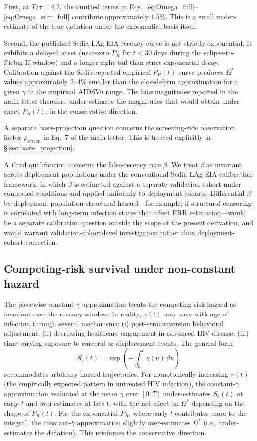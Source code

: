 \documentclass[11pt]{article}
\begin{document}
First, at $T/\tau = 4.2$, the omitted terms in Eqs.~\ref{eq:Omega_full}--\ref{eq:Omega_star_full} contribute approximately $1.5\%$. This is a small under-estimate of the true deflation under the exponential basis itself.

Second, the published Sedia LAg-EIA recency curve is not strictly exponential. It exhibits a delayed onset (near-zero $P_R$ for $t < 30$ days during the eclipse-to-Fiebig-II window) and a longer right tail than strict exponential decay. Calibration against the Sedia-reported empirical $P_R(t)$ curve produces $\Omega^*$ values approximately 2--4\% smaller than the closed-form approximation for a given $\gamma$ in the empirical AIDSVu range. The bias magnitudes reported in the main letter therefore under-estimate the magnitudes that would obtain under exact $P_R(t)$, in the conservative direction.

A separate basis-projection question concerns the screening-side observation factor $\rho_{\mathrm{screen}}$ in Eq.~7 of the main letter. This is treated explicitly in §\ref{sec:basis_projection}.

A third qualification concerns the false-recency rate $\beta$. We treat $\beta$ as invariant across deployment populations under the conventional Sedia LAg-EIA calibration framework, in which $\beta$ is estimated against a separate validation cohort under controlled conditions and applied uniformly to deployment cohorts. Differential $\beta$ by deployment-population structural hazard---for example, if structural censoring is correlated with long-term infection states that affect FRR estimation---would be a separate calibration question outside the scope of the present derivation, and would warrant validation-cohort-level investigation rather than deployment-cohort correction.

\subsection{Competing-risk survival under non-constant hazard}

The piecewise-constant $\gamma$ approximation treats the competing-risk hazard as invariant over the recency window. In reality, $\gamma(t)$ may vary with age-of-infection through several mechanisms: (i) post-seroconversion behavioral adjustment, (ii) decreasing healthcare engagement in advanced HIV disease, (iii) time-varying exposure to carceral or displacement events. The general form
\begin{equation}
S_c(t) = \exp\!\left(-\int_0^t \gamma(u)\,du\right)
\end{equation}
accommodates arbitrary hazard trajectories. For monotonically increasing $\gamma(t)$ (the empirically expected pattern in untreated HIV infection), the constant-$\gamma$ approximation evaluated at the mean $\bar\gamma$ over $[0, T]$ under-estimates $S_c(t)$ at early $t$ and over-estimates at late $t$, with the net effect on $\Omega^*$ depending on the shape of $P_R(t)$. For the exponential $P_R$, where early $t$ contributes more to the integral, the constant-$\bar\gamma$ approximation slightly over-estimates $\Omega^*$ (i.e., under-estimates the deflation). This reinforces the conservative direction.
\end{document}
